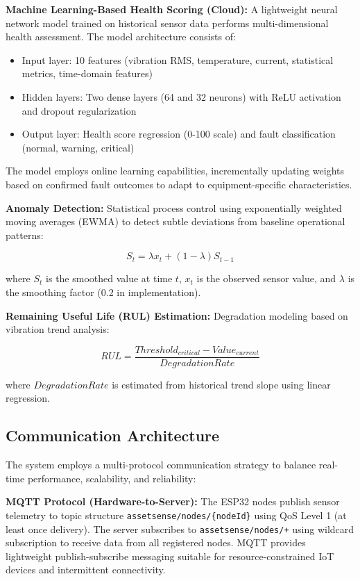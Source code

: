 \documentclass[conference]{IEEEtran}
\begin{document}
\textbf{Machine Learning-Based Health Scoring (Cloud):} A lightweight neural network model trained on historical sensor data performs multi-dimensional health assessment. The model architecture consists of:
\begin{itemize}
\item Input layer: 10 features (vibration RMS, temperature, current, statistical metrics, time-domain features)
\item Hidden layers: Two dense layers (64 and 32 neurons) with ReLU activation and dropout regularization
\item Output layer: Health score regression (0-100 scale) and fault classification (normal, warning, critical)
\end{itemize}

The model employs online learning capabilities, incrementally updating weights based on confirmed fault outcomes to adapt to equipment-specific characteristics.

\textbf{Anomaly Detection:} Statistical process control using exponentially weighted moving averages (EWMA) to detect subtle deviations from baseline operational patterns:

\begin{equation}
S_t = \lambda x_t + (1-\lambda)S_{t-1}
\end{equation}

where $S_t$ is the smoothed value at time $t$, $x_t$ is the observed sensor value, and $\lambda$ is the smoothing factor (0.2 in implementation).

\textbf{Remaining Useful Life (RUL) Estimation:} Degradation modeling based on vibration trend analysis:

\begin{equation}
RUL = \frac{Threshold_{critical} - Value_{current}}{DegradationRate}
\end{equation}

where $DegradationRate$ is estimated from historical trend slope using linear regression.

\subsection{Communication Architecture}

The system employs a multi-protocol communication strategy to balance real-time performance, scalability, and reliability:

\textbf{MQTT Protocol (Hardware-to-Server):} The ESP32 nodes publish sensor telemetry to topic structure \texttt{assetsense/nodes/\{nodeId\}} using QoS Level 1 (at least once delivery). The server subscribes to \texttt{assetsense/nodes/+} using wildcard subscription to receive data from all registered nodes. MQTT provides lightweight publish-subscribe messaging suitable for resource-constrained IoT devices and intermittent connectivity.
\end{document}

